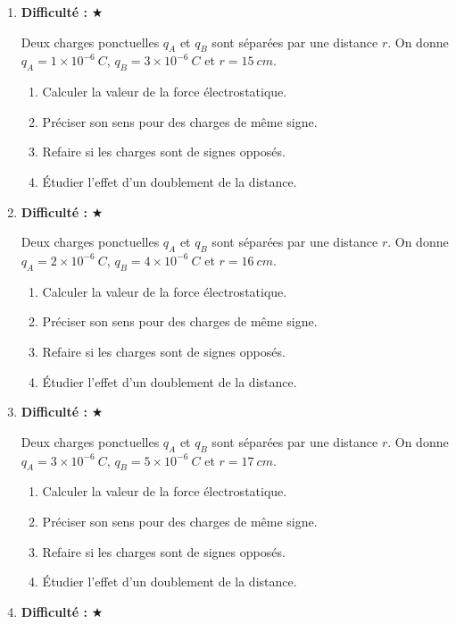 \documentclass[11pt,a4paper]{article}
\newcommand{\etoiles}[1]{\textbf{Difficulté : }#1}
\begin{document}
\begin{enumerate}[label=\textbf{Exercice \arabic*.},leftmargin=*]
Deux charges ponctuelles $q_A$ et $q_B$ sont séparées par une distance $r$.
On donne $q_A=5\times 10^{-6}\ \si{C}$, $q_B=2\times 10^{-6}\ \si{C}$ et $r=14\ \si{cm}$.
\begin{enumerate}[label=\alph*)]
\item Calculer la valeur de la force électrostatique.
\item Préciser son sens pour des charges de même signe.
\item Refaire si les charges sont de signes opposés.
\item Étudier l'effet d'un doublement de la distance.
\end{enumerate}
\item \etoiles{★}

Deux charges ponctuelles $q_A$ et $q_B$ sont séparées par une distance $r$.
On donne $q_A=1\times 10^{-6}\ \si{C}$, $q_B=3\times 10^{-6}\ \si{C}$ et $r=15\ \si{cm}$.
\begin{enumerate}[label=\alph*)]
\item Calculer la valeur de la force électrostatique.
\item Préciser son sens pour des charges de même signe.
\item Refaire si les charges sont de signes opposés.
\item Étudier l'effet d'un doublement de la distance.
\end{enumerate}
\item \etoiles{★}

Deux charges ponctuelles $q_A$ et $q_B$ sont séparées par une distance $r$.
On donne $q_A=2\times 10^{-6}\ \si{C}$, $q_B=4\times 10^{-6}\ \si{C}$ et $r=16\ \si{cm}$.
\begin{enumerate}[label=\alph*)]
\item Calculer la valeur de la force électrostatique.
\item Préciser son sens pour des charges de même signe.
\item Refaire si les charges sont de signes opposés.
\item Étudier l'effet d'un doublement de la distance.
\end{enumerate}
\item \etoiles{★}

Deux charges ponctuelles $q_A$ et $q_B$ sont séparées par une distance $r$.
On donne $q_A=3\times 10^{-6}\ \si{C}$, $q_B=5\times 10^{-6}\ \si{C}$ et $r=17\ \si{cm}$.
\begin{enumerate}[label=\alph*)]
\item Calculer la valeur de la force électrostatique.
\item Préciser son sens pour des charges de même signe.
\item Refaire si les charges sont de signes opposés.
\item Étudier l'effet d'un doublement de la distance.
\end{enumerate}
\item \etoiles{★}


\end{enumerate}
\end{document}
